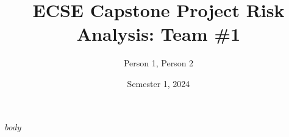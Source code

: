 \documentclass[a4paper]{article}
\begin{document}
\title{ECSE Capstone Project Risk Analysis: Team \#1}
\author{Person 1, Person 2}
\date{Semester 1, 2024}

\maketitle

$body$
\end{document}
